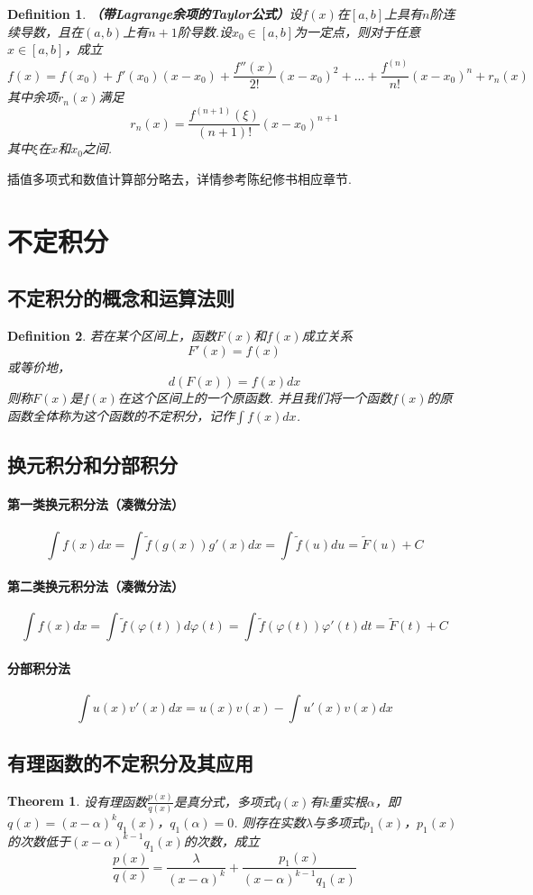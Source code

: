 \documentclass[9pt]{ctexart}
\newtheorem{definition}{Definition}[section]
\newtheorem{theorem}{Theorem}[section]
\begin{document}
\begin{definition}
    \textbf{（带Lagrange余项的Taylor公式）}设$f(x)$在$[a,b]$上具有$n$阶连续导数，且在$(a,b)$上有$n+1$阶导数.设$x_0\in[a,b]$为一定点，则对于任意$x\in[a,b]$，成立
    \[f(x)=f(x_0)+f'(x_0)(x-x_0)+\frac{f''(x)}{2!}(x-x_0)^2+...+\frac{f^{(n)}}{n!}(x-x_0)^n+r_n(x)\]
    其中余项$r_n(x)$满足
    \[r_n(x)=\frac{f^{(n+1)}(\xi)}{(n+1)!}(x-x_0)^{n+1}\]
    其中$\xi$在$x$和$x_0$之间.
\end{definition}
\par{插值多项式和数值计算部分略去，详情参考陈纪修书相应章节.}

\section{不定积分}
\subsection{不定积分的概念和运算法则}
\begin{definition}
    若在某个区间上，函数$F(x)$和$f(x)$成立关系
    \[F'(x)=f(x)\]
    或等价地，
    \[d(F(x))=f(x)dx\]
    则称$F(x)$是$f(x)$在这个区间上的一个原函数. 并且我们将一个函数$f(x)$的原函数全体称为这个函数的不定积分，记作$\int f(x)dx$.
\end{definition}
\subsection{换元积分和分部积分}
\paragraph{第一类换元积分法（凑微分法）}
\[\int f(x)dx=\int \tilde{f}(g(x))g'(x)dx=\int \tilde{f}(u)du=\tilde{F}(u)+C\]
\paragraph{第二类换元积分法（凑微分法）}
\[\int f(x)dx=\int \tilde{f}(\varphi(t))d\varphi(t)=\int \tilde{f}(\varphi(t))\varphi'(t)dt=\tilde{F}(t)+C\]
\paragraph{分部积分法}
\[\int u(x)v'(x)dx=u(x)v(x)-\int u'(x)v(x)dx\]
\subsection{有理函数的不定积分及其应用}
\begin{theorem}
    设有理函数$\frac{p(x)}{q(x)}$是真分式，多项式$q(x)$有$k$重实根$\alpha$，即$q(x)=(x-\alpha)^kq_1(x)$，$q_1(\alpha)=0$. 则存在实数$\lambda$与多项式$p_1(x)$，$p_1(x)$的次数低于$(x-\alpha)^{k-1}q_1(x)$的次数，成立
    \[\frac{p(x)}{q(x)}=\frac{\lambda}{(x-\alpha)^k}+\frac{p_1(x)}{(x-\alpha)^{k-1}q_1(x)}\]
\end{theorem}
\end{document}
